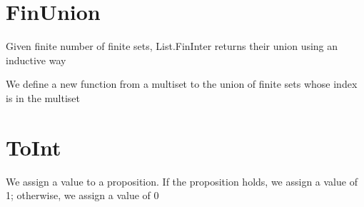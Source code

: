 \begin{lemma}\label{eq_FinInter₀}

\end{lemma}

\section{FinUnion}

\begin{definition}\label{List.FinUnion}
  \leanok
          Given finite number of finite sets, List.FinInter returns their union using an inductive way
\end{definition}

\begin{lemma}\label{List.eq_FinUnion}

\end{lemma}

\begin{definition}\label{Multiset.FinUnion}
          We define a new function from a multiset to the union of finite sets whose index is in the multiset
\end{definition}

\begin{lemma}\label{Multiset.eq_FinUnion}
\end{lemma}

\begin{definition}\label{FinUnion₀}

\end{definition}

\begin{lemma}\label{eq_FinUnion₀}

\end{lemma}

\section{ToInt}

\begin{definition}\label{toInt}
  \leanok
          We assign a value to a proposition. If the proposition holds, we assign a value of 1; otherwise, we assign a value of 0
\end{definition}


